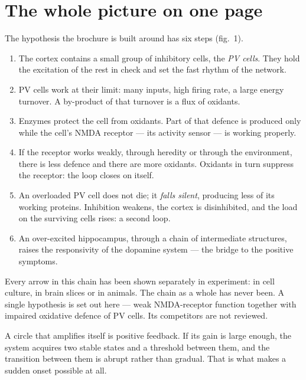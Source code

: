 \section{The whole picture on one page}
The hypothesis the brochure is built around has six steps (fig.~1).
\begin{enumerate}
\item The cortex contains a small group of inhibitory cells, the \emph{PV cells}. They hold the excitation of the rest in check and set the fast rhythm of the network.
\item PV cells work at their limit: many inputs, high firing rate, a large energy turnover. A by-product of that turnover is a flux of oxidants.
\item Enzymes protect the cell from oxidants. Part of that defence is produced only while the cell's NMDA receptor --- its activity sensor --- is working properly.
\item If the receptor works weakly, through heredity or through the environment, there is less defence and there are more oxidants. Oxidants in turn suppress the receptor: the loop closes on itself.
\item An overloaded PV cell does not die; it \emph{falls silent}, producing less of its working proteins. Inhibition weakens, the cortex is disinhibited, and the load on the surviving cells rises: a second loop.
\item An over-excited hippocampus, through a chain of intermediate structures, raises the responsivity of the dopamine system --- the bridge to the positive symptoms.
\end{enumerate}
\begin{note}
Every arrow in this chain has been shown separately in experiment: in cell culture, in brain slices or in animals. The chain as a whole has never been. A single hypothesis is set out here --- weak NMDA-receptor function together with impaired oxidative defence of PV cells. Its competitors are not reviewed.
\end{note}
\begin{ineq}
A circle that amplifies itself is positive feedback. If its gain is large enough, the system acquires two stable states and a threshold between them, and the transition between them is abrupt rather than gradual. That is what makes a sudden onset possible at all.
\end{ineq}
